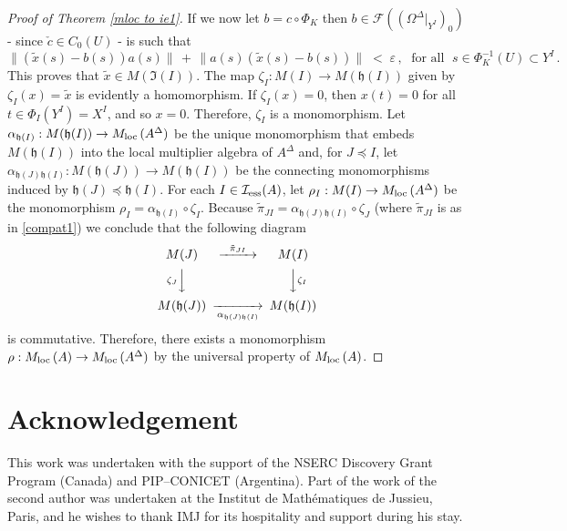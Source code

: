 \documentclass{amsart}
\theoremstyle{definition}
\theoremstyle{remark}
\begin{document}
\begin{proof}[Proof of Theorem \ref{mloc to ie1}]
If we now let $b=c\circ \Phi_K$ then $b\in {\mathcal{F}}((\Omega ^\Delta|_{Y^I})_0)$ - since $\check c\in C_0(U)$ - is such that
\[
\|\left( \tilde x(s)-b(s)\right)a(s)\|\,+\,\|a(s)\left( \tilde x(s)-b(s)\right)\|\;<\;\varepsilon\,,\;\mbox{ for all }\;s\in \Phi_K^{-1}(U)\subset Y^I\,.
\]
This proves that $\tilde x\in M(\mathfrak I(I))$.
The map $\zeta_I:M(I)\rightarrow M(\mathfrak h(I))$ given by $\zeta_I(x)=\tilde x$ is evidently a homomorphism.
If $\zeta_I(x)=0$, then $x(t)=0$ for all $t\in \Phi_I(Y^I)=X^I$, and so $x=0$. Therefore, $\zeta_I$ is a monomorphism.
Let $\alpha_{\mathfrak h(I)}:M(\mathfrak h(I))\rightarrow {M_{\rm loc}\,}(A^\Delta)$ be the unique monomorphism that embeds $M(\mathfrak h(I))$
into the local multiplier algebra of $A^\Delta$ and, for $J \preccurlyeq I$, let $\alpha_{\mathfrak h(J)\mathfrak h(I)}:M(\mathfrak h(J))\rightarrow M(\mathfrak h(I))$
be the connecting monomorphisms induced by $\mathfrak h(J) \preccurlyeq \mathfrak h(I)$.
For each  $I\in \mathcal I_{\rm ess}(A)$, let
 $\rho_I:M(I)\rightarrow {M_{\rm loc}\,}(A^\Delta)$ be the monomorphism $\rho_I=\alpha_{\mathfrak h(I)}\circ\zeta_I$.
Because $\tilde\pi_{JI}=\alpha_{\mathfrak h(J)\mathfrak h(I)}\circ\zeta_J$ (where $\tilde\pi_{JI}$ is as in \eqref{compat1}) we conclude that the following diagram
 \[
\begin{CD}
M(J) @>{\tilde\pi_{JI}}>> M(I) \\
@V{\zeta_J}VV           @VV{\zeta_I}V  \\
M(\mathfrak h(J))  @>>{\alpha_{\mathfrak h(J)\mathfrak h(I)}}>  M(\mathfrak h(I)) \\
\end{CD}
\]
is commutative.
Therefore, there exists a monomorphism $\rho:{M_{\rm loc}\,}(A)\rightarrow {M_{\rm loc}\,}(A^\Delta)$ by the universal property of ${M_{\rm loc}\,}(A)$. 
\end{proof}
\section*{Acknowledgement}
This work was undertaken with the support of the
NSERC Discovery Grant Program (Canada) and PIP--CONICET (Argentina). Part of the work of the second
author was undertaken at the Institut de Math\'ematiques de Jussieu, Paris, and he wishes to thank IMJ for its
hospitality and support during his stay.


\end{document}
